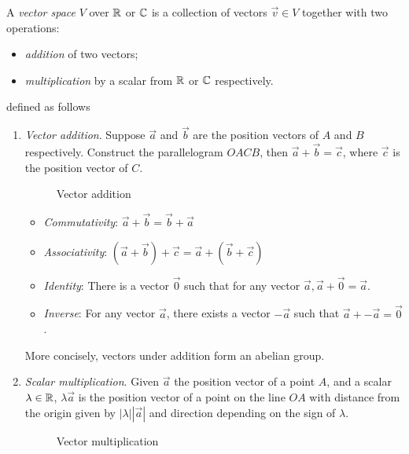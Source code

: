 \documentclass{../template/note}
\begin{document}
    \begin{definition}
        A \emph{vector space} \(V\) over \(\mathbb R\) or \(\mathbb C\) is a collection of vectors \(\vec v \in V\) together with two operations:
        \begin{itemize}
            \item \emph{addition} of two vectors;
            \item \emph{multiplication} by a scalar from \(\mathbb R\) or \(\mathbb C\) respectively.
        \end{itemize}
        defined as follows
        \begin{enumerate}[label=\protect\circled{\arabic*}]
            \item \emph{Vector addition}. Suppose \(\vec a\) and \(\vec b\) are the position vectors of \(A\) and \(B\) respectively. Construct the parallelogram \(OACB\), then \(\vec a + \vec b = \vec c\), where \(\vec c\) is the position vector of \(C\).
            \begin{figure}[ht]
                \centering
                \caption{Vector addition}
                \label{fig:vector-addition}
            \end{figure}
            \begin{itemize}
                \item \emph{Commutativity}: \(\vec a + \vec b = \vec b + \vec a\)
                \item \emph{Associativity}: \((\vec a + \vec b) + \vec c = \vec a + (\vec b + \vec c)\)
                \item \emph{Identity}: There is a vector \(\vec 0\) such that for any vector \(\vec a, \vec a + \vec 0 = \vec a\).
                \item \emph{Inverse}: For any vector \(\vec a\), there exists a vector \(-\vec a\) such that \(\vec a + -\vec a = \vec 0\).
            \end{itemize}
            More concisely, vectors under addition form an abelian group.

            \item \emph{Scalar multiplication}. Given \(\vec a\) the position vector of a point \(A\), and a scalar \(\lambda \in \mathbb R\), \(\lambda \vec a\) is the position vector of a point on the line \(OA\) with distance from the origin given by \(|\lambda||\vec a|\) and direction depending on the sign of \(\lambda\).
            
            \begin{figure}[ht]
                \centering
                \caption{Vector multiplication}
                \label{fig:vector-multiplication}
            \end{figure}
            

\end{enumerate}
\end{definition}
\end{document}
